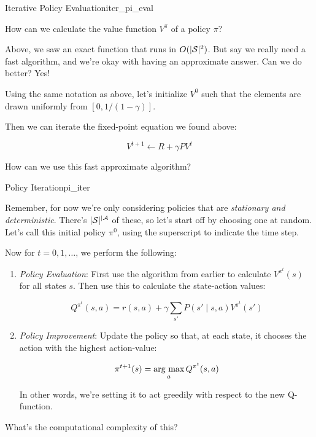 \documentclass[../main/main]{subfiles}
\begin{document}
\begin{theorem}{Iterative Policy Evaluation}{iter_pi_eval}

How can we calculate the value function $V^\pi$ of a policy $\pi$?

Above, we saw an exact function that runs in $O(|\mathcal{S}|^2)$.
But say we really need a fast algorithm, and we're okay with having an
approximate answer. Can we do better? Yes!

Using the same notation as above,
let's initialize $V^0$ such that the elements are drawn uniformly
from $[0, 1/(1-\gamma)]$.

Then we can iterate the fixed-point equation we found above:

\[ V^{t+1} \gets R + \gamma P V^t \]


\end{theorem}


How can we use this fast approximate algorithm?

\begin{theorem}{Policy Iteration}{pi_iter}

Remember, for now we're only considering policies that are
\emph{stationary and deterministic}. There's $|\mathcal{S}|^{|\mathcal{A}}$ of these, so let's
start off by choosing one at random. Let's call this initial policy $\pi^0$,
using the superscript to indicate the time step.

Now for $t = 0, 1, \dots$, we perform the following:

\begin{enumerate}
    
\item \emph{Policy Evaluation}: First use the algorithm from earlier to
    calculate $V^{\pi^t}(s)$ for all states $s$. Then use this to calculate the
    state-action values:

    \[
        Q^{\pi^t}(s, a) = r(s, a) + \gamma \sum_{s'} P(s' \mid s, a) V^{\pi^t} (s')
    \]

\item \emph{Policy Improvement}: Update the policy so that, at each state,
    it chooses the action with the highest action-value:

    \[
        \pi^{t+1}(s) = \operatorname*{\textrm{arg\ max}}_a Q^{\pi^t} (s, a)
    \]

    In other words, we're setting it to act greedily with respect to the new Q-function.

\end{enumerate}

What's the computational complexity of this?


\end{theorem}
\end{document}
